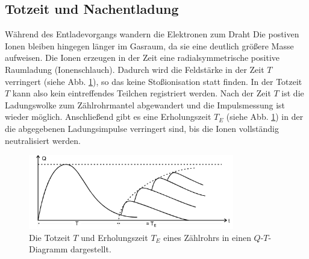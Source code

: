 \subsection{Totzeit und Nachentladung}
Während des Entladevorgangs wandern die Elektronen zum Draht
Die postiven Ionen bleiben hingegen länger im Gasraum, da sie eine deutlich größere Masse aufweisen.
Die Ionen erzeugen in der Zeit eine radialsymmetrische positive Raumladung (Ionenschlauch).
Dadurch wird die Feldstärke in der Zeit $T$ verringert (siehe Abb. \ref{fig:totzeit}), so das keine Stoßionisation statt finden.
In der Totzeit $T$ kann also kein eintreffendes Teilchen registriert werden.
Nach der Zeit $T$ ist die Ladungswolke zum Zählrohrmantel abgewandert und die Impulsmessung ist wieder möglich.
Anschließend gibt es eine Erholungszeit $T_E$ (siehe Abb. \ref{fig:totzeit}) in der die abgegebenen Ladungsimpulse verringert sind, bis die Ionen vollständig neutralisiert werden.
\begin{figure}
    \centering
    \includegraphics[width=0.8\textwidth]{content/data/totzeit.jpg}
    \caption{Die Totzeit $T$ und Erholungszeit $T_E$ eines Zählrohrs in einen $Q$-$T$-Diagramm dargestellt. \cite[4]{anleitung}}
    \label{fig:totzeit}
\end{figure}


